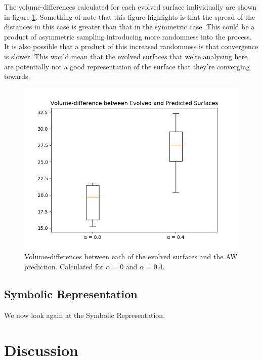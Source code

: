 \documentclass[11pt]{book}
\newcommand*{\np}{\par\noindent\newline}
\begin{document}
\np The volume-differences calculated for each evolved surface individually are shown in figure \ref{asymmetric_distance_boxplot_r_00_04}.
Something of note that this figure highlights is that the spread of the distances in this case is greater than that in the symmetric case.
This could be a product of asymmetric sampling introducing more randomness into the process.
It is also possible that a product of this increased randomness is that convergence is slower.
This would mean that the evolved surfaces that we're analysing here are potentially not a good representation of the surface that they're converging towards.

\begin{figure}
	\centering
	\includegraphics[scale=0.6]{resources/asymmetric_distance_boxplot_r_00_04.png}
	\caption{Volume-differences between each of the evolved surfaces and the AW prediction. Calculated for $\alpha = 0$ and $\alpha = 0.4$.}
	\label{asymmetric_distance_boxplot_r_00_04}
\end{figure}



\section{Symbolic Representation}\label{asymmetricGames_symb}
We now look again at the Symbolic Representation.



\chapter{Discussion}\label{discussion}
\end{document}
